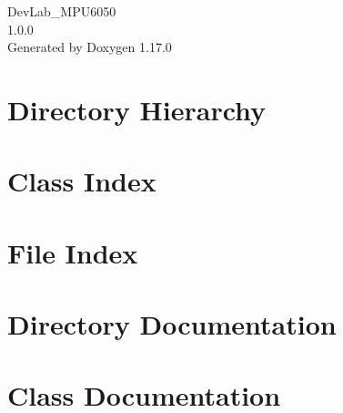 \documentclass[twoside]{book}
\newcommand{\+}{\discretionary{\mbox{\scriptsize$\hookleftarrow$}}{}{}}
\newcommand{\clearemptydoublepage}{%
    \newpage{\pagestyle{empty}\cleardoublepage}%
  }
\begin{document}
  \raggedbottom
    \hypersetup{pageanchor=false,
                bookmarksnumbered=true,
                pdfencoding=unicode
               }
  \begin{titlepage}
  \vspace*{7cm}
  \begin{center}%
  {\Large Dev\+Lab\+\_\+\+MPU6050}\\
  [1ex]\large 1.\+0.\+0 \\
  \vspace*{1cm}
  {\large Generated by Doxygen 1.17.0}\\
  \end{center}
  \end{titlepage}
  \clearemptydoublepage
  \tableofcontents
  \clearemptydoublepage
  \hypersetup{pageanchor=true}
\chapter{Directory Hierarchy}

\chapter{Class Index}

\chapter{File Index}

\chapter{Directory Documentation}









\chapter{Class Documentation}



\end{document}

